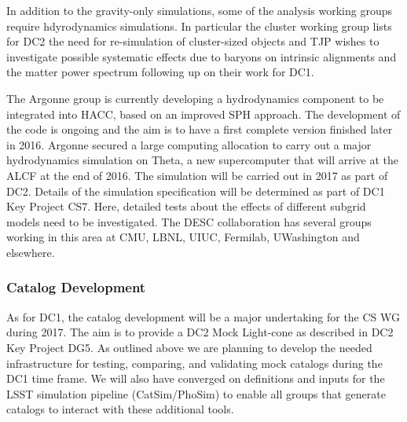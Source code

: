 In addition to the gravity-only simulations, some of the analysis working groups require hdyrodynamics simulations. In particular the cluster working group lists for DC2 the need for re-simulation of cluster-sized objects and TJP wishes to investigate possible systematic effects due to baryons on intrinsic alignments and the matter power spectrum following up on their work for DC1.

The Argonne group is currently developing a hydrodynamics component to be integrated into HACC, based on an improved SPH approach. The development of the code is ongoing and the aim is to have a first complete version finished later in 2016. Argonne secured a large computing allocation to carry out a major hydrodynamics simulation on Theta, a new supercomputer that will arrive at the ALCF at the end of 2016. The simulation will be carried out in 2017 as part of DC2. Details of the simulation specification will be determined as part of DC1 Key Project CS7. Here, detailed tests about the effects of different subgrid models need to be investigated. The DESC collaboration has several groups working in this area at CMU, LBNL, UIUC, Fermilab, UWashington and elsewhere. %



\subsubsection{Catalog Development}
\label{sec:keysims:dc2:dev}

As for DC1, the catalog development will be a major undertaking for the CS WG during 2017. The aim is to provide a DC2 Mock Light-cone as described in DC2 Key Project DG5. As outlined above we are planning to develop the needed infrastructure for testing, comparing, and validating mock catalogs during the DC1 time frame. We will also have converged on definitions and inputs for the LSST simulation pipeline (CatSim/PhoSim) to enable all groups that generate catalogs to interact with these additional tools. 


